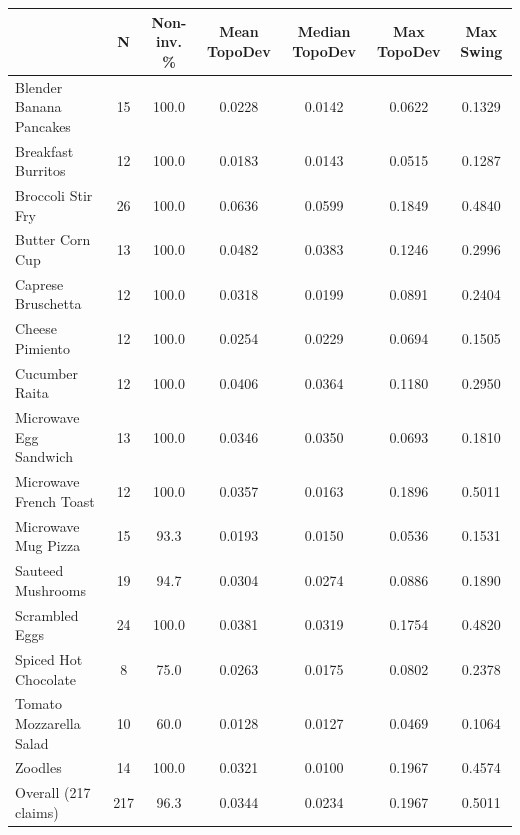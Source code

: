 \begin{table}[t]
\centering
\begin{tabular}{lcccccc}
\toprule
 & N & Non-inv. \% & Mean TopoDev & Median TopoDev & Max TopoDev & Max Swing \\
\midrule
Blender Banana Pancakes & 15 & 100.0 & 0.0228 & 0.0142 & 0.0622 & 0.1329 \\
Breakfast Burritos & 12 & 100.0 & 0.0183 & 0.0143 & 0.0515 & 0.1287 \\
Broccoli Stir Fry & 26 & 100.0 & 0.0636 & 0.0599 & 0.1849 & 0.4840 \\
Butter Corn Cup & 13 & 100.0 & 0.0482 & 0.0383 & 0.1246 & 0.2996 \\
Caprese Bruschetta & 12 & 100.0 & 0.0318 & 0.0199 & 0.0891 & 0.2404 \\
Cheese Pimiento & 12 & 100.0 & 0.0254 & 0.0229 & 0.0694 & 0.1505 \\
Cucumber Raita & 12 & 100.0 & 0.0406 & 0.0364 & 0.1180 & 0.2950 \\
Microwave Egg Sandwich & 13 & 100.0 & 0.0346 & 0.0350 & 0.0693 & 0.1810 \\
Microwave French Toast & 12 & 100.0 & 0.0357 & 0.0163 & 0.1896 & 0.5011 \\
Microwave Mug Pizza & 15 & 93.3 & 0.0193 & 0.0150 & 0.0536 & 0.1531 \\
Sauteed Mushrooms & 19 & 94.7 & 0.0304 & 0.0274 & 0.0886 & 0.1890 \\
Scrambled Eggs & 24 & 100.0 & 0.0381 & 0.0319 & 0.1754 & 0.4820 \\
Spiced Hot Chocolate & 8 & 75.0 & 0.0263 & 0.0175 & 0.0802 & 0.2378 \\
Tomato Mozzarella Salad & 10 & 60.0 & 0.0128 & 0.0127 & 0.0469 & 0.1064 \\
Zoodles & 14 & 100.0 & 0.0321 & 0.0100 & 0.1967 & 0.4574 \\
Overall (217 claims) & 217 & 96.3 & 0.0344 & 0.0234 & 0.1967 & 0.5011 \\
\bottomrule
\end{tabular}
\end{table}